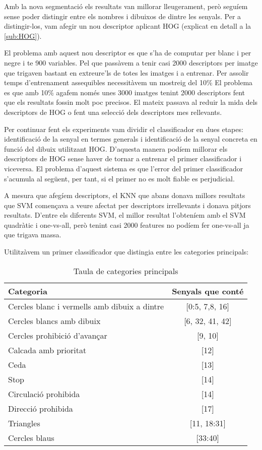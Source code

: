 Amb la nova segmentació els resultats van millorar lleugerament, però seguíem sense poder distingir entre els nombres
i dibuixos de dintre les senyals. Per a distingir-los, vam afegir un nou descriptor aplicant HOG
(explicat en detall a la \cref{sub:HOG}).

El problema amb aquest nou descriptor es que s'ha de computar per blanc i per negre i te 900 variables. Pel que passàvem
a tenir casi 2000 descriptors per imatge que trigaven bastant en extreure'ls de totes les imatges i a entrenar.
Per assolir temps d'entrenament assequibles necessitàvem un mostreig del 10\%
El problema es que amb 10\% agafem només unes 3000 imatges tenint 2000
descriptors fent que els resultats fossin molt poc precisos. El mateix passava
al reduir la mida dels descriptors de HOG o fent una selecció dels descriptors
mes rellevants.

Per continuar fent els experiments vam dividir el classificador en dues etapes: identificació de la senyal en termes generals
i identificació de la senyal concreta en funció del dibuix utilitzant HOG. D'aquesta manera podíem millorar els descriptors
de HOG sense haver de tornar a entrenar el primer classificador i viceversa. El problema d'aquest sistema es que l'error
del primer classificador s'acumula al següent, per tant, si el primer no es molt
fiable es perjudicial.

A mesura que afegíem descriptors, el KNN que abans donava millors resultats que SVM començava a veure afectat per
descriptors irrellevants i donava pitjors resultats. D'entre els diferents SVM, el millor resultat l'obteníem amb
el SVM quadràtic i one-vs-all, però tenint casi 2000 features no podíem fer one-vs-all ja que trigava massa.

Utilitzàvem un primer classificador que distingia entre les categories
principals:

\begin{table}[H]
    \centering
    \caption{Taula de categories principals}%
    \label{tab:cat_prin}
    \begin{tabular}{lc}
        \toprule
        Categoria & Senyals que conté \\
        \midrule
        Cercles blanc i vermells amb dibuix a dintre & [0:5, 7,8, 16] \\
        Cercles blancs amb dibuix & [6, 32, 41, 42] \\
        Cercles prohibició d'avançar & [9, 10] \\
        Calcada amb prioritat & [12] \\
        Ceda & [13] \\
        Stop & [14] \\
        Circulació prohibida & [14] \\
        Direcció prohibida & [17] \\
        Triangles & [11, 18:31] \\
        Cercles blaus & [33:40] \\
        \bottomrule
    \end{tabular}
\end{table}

